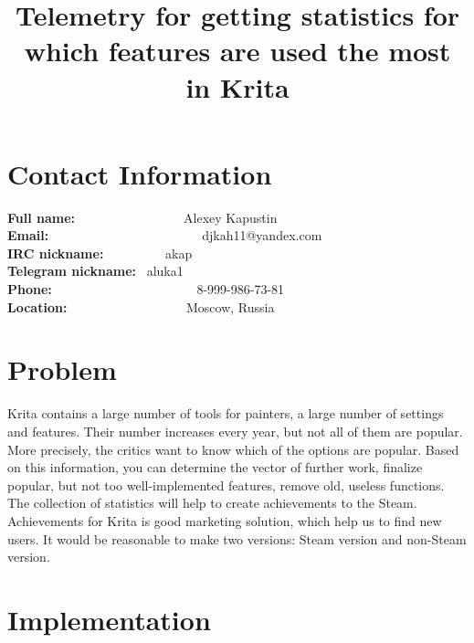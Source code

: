 \documentclass[]{article}
\title{Telemetry for getting statistics for which features are used the most in Krita} %
\begin{document}
\maketitle
\section{Contact Information}
\textbf{Full name:}~~~~~~~~~~~~~~~~~Alexey Kapustin \\
\textbf{Email:}~~~~~~~~~~~~~~~~~~~~~~~~djkah11@yandex.com \\
\textbf{IRC nickname:      }~~~~~~~~~akap \\
\textbf{Telegram nickname: }~aluka1 \\
\textbf{Phone: }~~~~~~~~~~~~~~~~~~~~~~8-999-986-73-81 \\
\textbf{Location:          }~~~~~~~~~~~~~~~~~~Moscow, Russia
\section{Problem}
Krita contains a large number of tools for painters, a large number of settings and features.
Their number increases every year, but not all of them are popular. More precisely, the critics want to know which of the options are popular. Based on this information, you can determine the vector of further work, finalize popular, but not too well-implemented features, remove old, useless functions.
The collection of statistics will help to create  achievements to the Steam. Achievements for Krita is good marketing solution, which help us to find new users. It would be reasonable to make two versions: Steam version and non-Steam version.

\section{Implementation}
\end{document}
